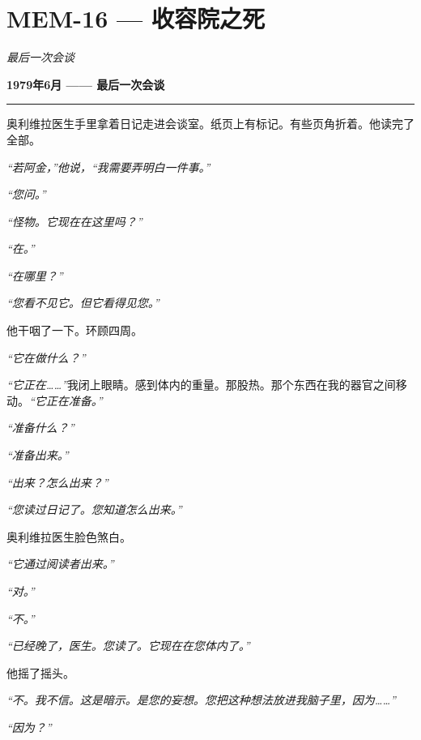 \section*{\textbf{MEM-16} --- 收容院之死}

\noindent \textit{最后一次会谈}

\noindent \textbf{1979年6月 —— 最后一次会谈}

\vspace{0.5em}\noindent\rule{\textwidth}{0.5pt}\vspace{0.5em}

\noindent 奥利维拉医生手里拿着日记走进会谈室。纸页上有标记。有些页角折着。他读完了全部。

\noindent \textit{“若阿金，”他说，“我需要弄明白一件事。”}

\noindent \textit{“您问。”}

\noindent \textit{“怪物。它现在在这里吗？”}

\noindent \textit{“在。”}

\noindent \textit{“在哪里？”}

\noindent \textit{“您看不见它。但它看得见您。”}

\noindent 他干咽了一下。环顾四周。

\noindent \textit{“它在做什么？”}

\noindent \textit{“它正在……”}我闭上眼睛。感到体内的重量。那股热。那个东西在我的器官之间移动。\textit{“它正在准备。”}

\noindent \textit{“准备什么？”}

\noindent \textit{“准备出来。”}

\noindent \textit{“出来？怎么出来？”}

\noindent \textit{“您读过日记了。您知道怎么出来。”}

\noindent 奥利维拉医生脸色煞白。

\noindent \textit{“它通过阅读者出来。”}

\noindent \textit{“对。”}

\noindent \textit{“不。”}

\noindent \textit{“已经晚了，医生。您读了。它现在在您体内了。”}

\noindent 他摇了摇头。

\noindent \textit{“不。我不信。这是暗示。是您的妄想。您把这种想法放进我脑子里，因为……”}

\noindent \textit{“因为？”}

